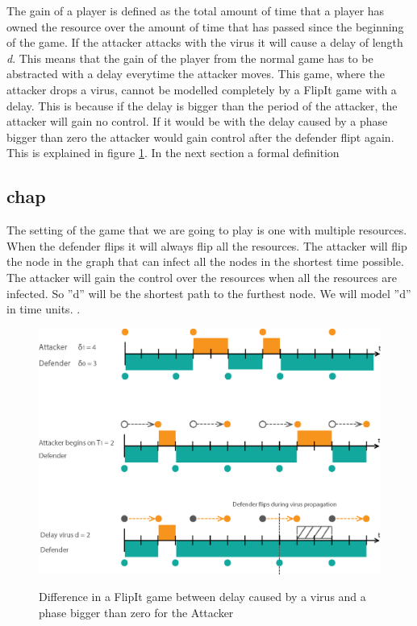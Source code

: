 The gain of a player is defined as the total amount of time that a player has owned the resource over the amount of time that has passed since the beginning of the game. If the attacker attacks with the virus it will cause a delay of length \textit{d}. This means that the gain of the player from the normal game has to be abstracted with a delay everytime the attacker moves. This game, where the attacker drops a virus, cannot be modelled completely by a FlipIt game with a delay. This is because if the delay is bigger than the period of the attacker, the attacker will gain no control. If it would be with the delay caused by a phase bigger than zero the attacker would gain control after the defender flipt again. This is explained in figure \ref{fig:virusflip}. In the next section a formal definition 

\subsection{chap}
The setting of the game that we are going to play is one with multiple resources. When the defender flips it will always flip all the resources. The attacker will flip the node in the graph that can infect all the nodes in the shortest time possible. The attacker will gain the control over the resources when all the resources are infected. So ''d'' will be the shortest path to the furthest node. We will model ''d'' in time units. .
\begin{figure}[hbtp]
\caption{Difference in a FlipIt game between delay caused by a virus and a phase bigger than zero for the Attacker}
\centering
\includegraphics[scale=1]{Images/Flipvirus}
\label{fig:virusflip}
\end{figure}




